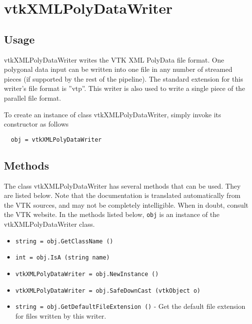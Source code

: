 \section{vtkXMLPolyDataWriter}

\subsection{Usage}

 vtkXMLPolyDataWriter writes the VTK XML PolyData file format.  One
 polygonal data input can be written into one file in any number of
 streamed pieces (if supported by the rest of the pipeline).  The
 standard extension for this writer's file format is ''vtp''.  This
 writer is also used to write a single piece of the parallel file
 format.

To create an instance of class vtkXMLPolyDataWriter, simply
invoke its constructor as follows
\begin{verbatim}
  obj = vtkXMLPolyDataWriter
\end{verbatim}
\subsection{Methods}

The class vtkXMLPolyDataWriter has several methods that can be used.
  They are listed below.
Note that the documentation is translated automatically from the VTK sources,
and may not be completely intelligible.  When in doubt, consult the VTK website.
In the methods listed below, \verb|obj| is an instance of the vtkXMLPolyDataWriter class.
\begin{itemize}
\item  \verb|string = obj.GetClassName ()|

\item  \verb|int = obj.IsA (string name)|

\item  \verb|vtkXMLPolyDataWriter = obj.NewInstance ()|

\item  \verb|vtkXMLPolyDataWriter = obj.SafeDownCast (vtkObject o)|

\item  \verb|string = obj.GetDefaultFileExtension ()| -  Get the default file extension for files written by this writer.

\end{itemize}
